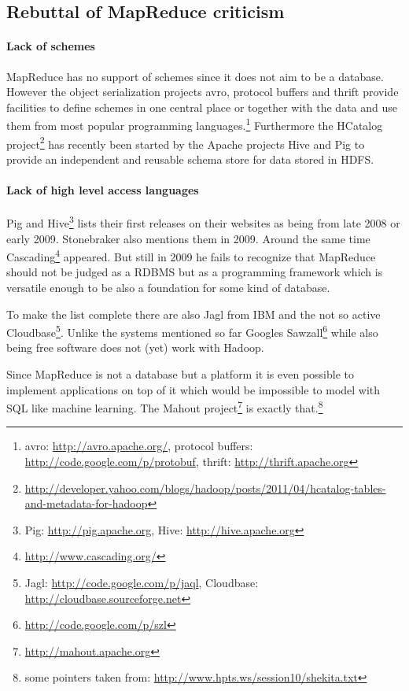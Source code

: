 \documentclass[12pt,a4paper]{scrartcl}		%
\begin{document}
\subsection{Rebuttal of MapReduce criticism}
\paragraph{Lack of schemes}
MapReduce has no support of schemes since it does not aim to be a database. However the object serialization projects avro, protocol buffers and thrift provide facilities to define schemes in one central place or together with the data and use them from most popular programming languages.\footnote{avro: \url{http://avro.apache.org/}, protocol buffers: \url{http://code.google.com/p/protobuf}, thrift: \url{http://thrift.apache.org}}
Furthermore the HCatalog project\footnote{\url{http://developer.yahoo.com/blogs/hadoop/posts/2011/04/hcatalog-tables-and-metadata-for-hadoop}} has recently been started by the Apache projects Hive and Pig to provide an independent and reusable schema store for data stored in HDFS.

\paragraph{Lack of high level access languages}
Pig and Hive\footnote{Pig: \url{http://pig.apache.org}, Hive: \url{http://hive.apache.org}} lists their first releases on their websites as being from late 2008 or early 2009. Stonebraker also mentions them in 2009\cite[p. 3, sec. 3.3 programming model]{Pavlo09}. Around the same time Cascading\footnote{\url{http://www.cascading.org/}} appeared. But still in 2009 he fails to recognize that MapReduce should not be judged as a RDBMS but as a programming framework which is versatile enough to be also a foundation for some kind of database.

To make the list complete there are also Jagl from IBM and the not so active Cloudbase\footnote{Jagl: \url{http://code.google.com/p/jaql}, Cloudbase: \url{http://cloudbase.sourceforge.net}}. Unlike the systems mentioned so far Googles Sawzall\footnote{\url{http://code.google.com/p/szl}} while also being free software does not (yet) work with Hadoop.

Since MapReduce is not a database but a platform it is even possible to implement applications on top of it which would be impossible to model with SQL like machine learning. The Mahout project\footnote{\url{http://mahout.apache.org}} is exactly that.\footnote{some pointers taken from: \url{http://www.hpts.ws/session10/shekita.txt}}
\end{document}
